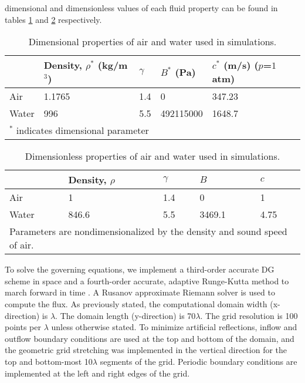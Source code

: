 dimensional and dimensionless values of each fluid property can be
found in tables \ref{tab:usbe_lung_dimensional_parameters} and
\ref{tab:usbe_lung_dimensionless_parameters} respectively.
% 
\begin{table}[htbp]%
  \begin{center}
    \caption{Dimensional properties of air and water used in simulations.}
    \label{tab:usbe_lung_dimensional_parameters}%
    \begin{tabularx}{0.75\textwidth}{| X | X | X | X | X |}
      \hline
      & Density, $\rho^*$ (kg/m$^3$) & $\gamma$ & $B^*$ (Pa)  & $c^*$ (m/s) ($p$=$1$ atm) \\ \hline
      Air   & 1.1765                        & 1.4      & 0         & 347.23     \\ \hline
      Water & 996                           & 5.5      & 492115000 & 1648.7     \\ \hline
      \multicolumn{5}{l}{\small $^*$ indicates dimensional parameter}
    \end{tabularx}
  \end{center}
\end{table}%
\begin{table}[htbp]%
  \begin{center}
    \caption{Dimensionless properties of air and water used in simulations.}
    \label{tab:usbe_lung_dimensionless_parameters}%
    \begin{tabularx}{0.75\textwidth}{| X | X | X | X | X |}
      \hline
      & Density, $\rho$ & $\gamma$ & $B$ & $c$ \\ \hline
      Air   & 1                          & 1.4      & 0         & 1          \\ \hline
      Water & 846.6                      & 5.5      & 3469.1    & 4.75       \\ \hline
      \multicolumn{5}{l}{\small Parameters are nondimensionalized by the density and sound speed of air. }
    \end{tabularx}
  \end{center}
\end{table}

To solve the governing equations, we implement a third-order accurate
\ac{DG} scheme in space and a fourth-order accurate, adaptive
Runge-Kutta method to march forward in time
\citep{HenrydeFrahan2015}. A Rusanov approximate Riemann solver is
used to compute the flux.  As previously stated, the computational
domain width (x-direction) is $\lambda$. The domain length
(y-direction) is 70$\lambda$. The grid resolution is 100 points per
$\lambda$ unless otherwise stated. To minimize artificial reflections,
inflow and outflow boundary conditions are used at the top and bottom
of the domain, and the geometric grid stretching was implemented in
the vertical direction for the top and bottom-most 10$\lambda$
segments of the grid. Periodic boundary conditions are implemented at
the left and right edges of the grid.


